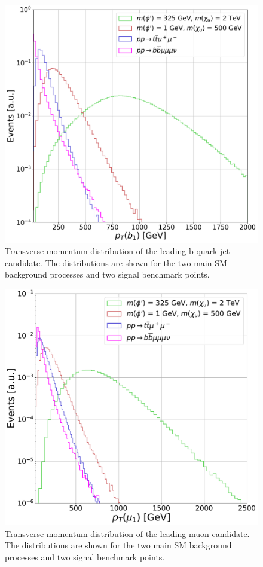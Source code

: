 \begin{figure}
\centering
\includegraphics[width=.75\linewidth]{Images/PT_b1.pdf}
\caption{Transverse momentum distribution of the leading \textrm{b}-quark jet candidate. The distributions are shown for the two main SM background processes and two signal benchmark points.\label{fig:pTb1}}
\end{figure}

\begin{figure}
\centering
\includegraphics[width=.75\linewidth]{Images/PT_mu1_1.pdf}
\caption{Transverse momentum distribution of the leading muon candidate. The distributions are shown for the two main SM background processes and two signal benchmark points.\label{fig:pTmu1}}
\end{figure}


